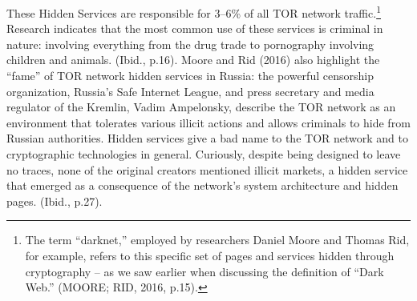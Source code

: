 These Hidden Services are responsible for 3--6\% of all TOR network traffic.\footnote{The term ``darknet,'' employed by researchers Daniel Moore and Thomas Rid, for example, refers to this specific set of pages and services hidden through cryptography -- as we saw earlier when discussing the definition of ``Dark Web.'' (MOORE; RID, 2016, p.15).} Research indicates that the most common use of these services is criminal in nature: involving everything from the drug trade to pornography involving children and animals. (Ibid., p.16). Moore and Rid (2016) also highlight the ``fame'' of TOR network hidden services in Russia: the powerful censorship organization, Russia's Safe Internet League, and press secretary and media regulator of the Kremlin, Vadim Ampelonsky, describe the TOR network as an environment that tolerates various illicit actions and allows criminals to hide from Russian authorities. Hidden services give a bad name to the TOR network and to cryptographic technologies in general. Curiously, despite being designed to leave no traces, none of the original creators mentioned illicit markets, a hidden service that emerged as a consequence of the network's system architecture and hidden pages. (Ibid., p.27).


